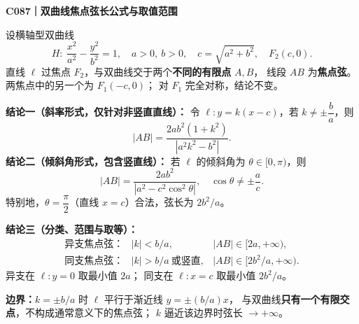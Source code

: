 \begin{statementbox}
\textbf{C087｜双曲线焦点弦长公式与取值范围}

设横轴型双曲线
\[
H:\ \frac{x^2}{a^2}-\frac{y^2}{b^2}=1,\quad
 a>0,\ b>0,\quad c=\sqrt{a^2+b^2},\quad F_2(c,0).
\]
直线 $\ell$ 过焦点 $F_2$，与双曲线交于两个\textbf{不同的有限点} $A,B$，
线段 $AB$ 为\textbf{焦点弦}。两焦点中的另一个为 $F_1(-c,0)$；
对 $F_1$ 完全对称，结论不变。
\begin{center}\end{center}

\textbf{结论一（斜率形式，仅针对非竖直直线）：}
令 $\ell:y=k(x-c)$，若 $k\ne\pm\dfrac ba$，则
\[
\boxed{|AB|=\frac{2ab^2(1+k^2)}{|a^2k^2-b^2|}}.
\]
\textbf{结论二（倾斜角形式，包含竖直线）：}
若 $\ell$ 的倾斜角为 $\theta\in[0,\pi)$，则
\[
\boxed{|AB|=\frac{2ab^2}{|a^2-c^2\cos^2\theta|}},
\quad \cos\theta\ne\pm\frac ac.
\]
特别地，$\theta=\dfrac\pi2$（直线 $x=c$）合法，弦长为 $2b^2/a$。

\end{statementbox}
\clearpage
\begin{statementbox}
\textbf{结论三（分类、范围与取等）：}
\[
\boxed{\begin{array}{lcl}
\text{异支焦点弦：}& |k|<b/a,& |AB|\in[2a,+\infty),\\[3pt]
\text{同支焦点弦：}& |k|>b/a\ \text{或竖直},& |AB|\in[2b^2/a,+\infty).
\end{array}}
\]
异支在 $\ell:y=0$ 取最小值 $2a$；
同支在 $\ell:x=c$ 取最小值 $2b^2/a$。
\begin{center}\end{center}
\textbf{边界：}$k=\pm b/a$ 时 $\ell$ 平行于渐近线 $y=\pm(b/a)x$，
与双曲线\textbf{只有一个有限交点}，不构成通常意义下的焦点弦；
$k$ 逼近该边界时弦长 $\to+\infty$。
\end{statementbox}
